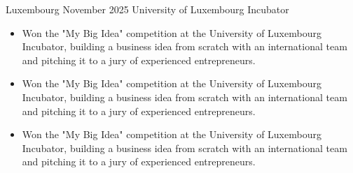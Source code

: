 {Luxembourg}
{November 2025}
{University of Luxembourg Incubator}
{\footnotesize\faCode \hspace{1pt}
}

\begin{itemize}

    \ifde
        \item Won the "My Big Idea" competition at the University of Luxembourg Incubator, building a business idea from scratch with an international team and pitching it to a jury of experienced entrepreneurs.
    \else
        \ifhpc
            \item Won the "My Big Idea" competition at the University of Luxembourg Incubator, building a business idea from scratch with an international team and pitching it to a jury of experienced entrepreneurs.
        \else
            \item Won the "My Big Idea" competition at the University of Luxembourg Incubator, building a business idea from scratch with an international team and pitching it to a jury of experienced entrepreneurs.
        \fi
    \fi

\end{itemize}

\medskip

